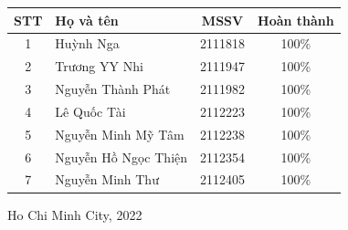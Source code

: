 \documentclass[11pt,a4paper]{article}
\begin{document}
\begin{titlepage}
\begin{table}[h]
\begin{tabular}{rrl}
			\end{tabular}
		\end{table}
	\begin{center}
		\begin{tabular}{|c|l|c|c|}
			\hline
			\textbf{STT}  &\textbf{ Họ và tên} & \textbf{MSSV} & \textbf{Hoàn thành}\\
			\hline
			1 & Huỳnh Nga  & 2111818 & 100\% \\
			\hline
			2 & Trương YY Nhi & 2111947 & 100\% \\
			\hline
			3 & Nguyễn Thành Phát & 2111982 & 100\% \\
			\hline
			4 & Lê Quốc Tài & 2112223 & 100\%\\
			\hline 
			5 & Nguyễn Minh Mỹ Tâm & 2112238  & 100\%\\
			\hline
			6 & Nguyễn Hồ Ngọc Thiện & 2112354 & 100\%\\
			\hline
			7 & Nguyễn Minh Thư & 2112405 & 100\%\\
			\hline
		\end{tabular}
	\end{center}
		\vspace{1cm}
		\begin{center}
			{\footnotesize Ho Chi Minh City, 2022}
		\end{center}
	\end{titlepage}
	\newpage
	
	\tableofcontents
	
	\newpage
	
	\newpage 
	 
	
\end{document}
